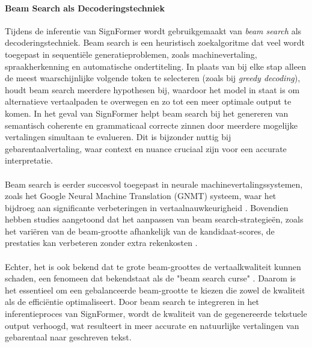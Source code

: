 \paragraph{Beam Search als Decoderingstechniek}

Tijdens de inferentie van SignFormer wordt gebruikgemaakt van \emph{beam search} als decoderingstechniek. 
Beam search is een heuristisch zoekalgoritme dat veel wordt toegepast in sequentiële generatieproblemen, zoals machinevertaling, spraakherkenning en automatische ondertiteling. 
In plaats van bij elke stap alleen de meest waarschijnlijke volgende token te selecteren (zoals bij \emph{greedy decoding}), houdt beam search meerdere hypothesen bij, waardoor het model in staat is om alternatieve vertaalpaden te overwegen en zo tot een meer optimale output te komen.
In het geval van SignFormer helpt beam search bij het genereren van semantisch coherente en grammaticaal correcte zinnen door meerdere mogelijke vertalingen simultaan te evalueren. Dit is bijzonder nuttig bij gebarentaalvertaling, waar context en nuance cruciaal zijn voor een accurate interpretatie.
\\
\\
Beam search is eerder succesvol toegepast in neurale machinevertalingssystemen, zoals het Google Neural Machine Translation (GNMT) systeem, waar het bijdroeg aan significante verbeteringen in vertaalnauwkeurigheid \autocite{wu2016google}. 
Bovendien hebben studies aangetoond dat het aanpassen van beam search-strategieën, zoals het variëren van de beam-grootte afhankelijk van de kandidaat-scores, de prestaties kan verbeteren zonder extra rekenkosten \autocite{freitag2017beam}. 
\\
\\
Echter, het is ook bekend dat te grote beam-groottes de vertaalkwaliteit kunnen schaden, een fenomeen dat bekendstaat als de "beam search curse" \autocite{yang2018breaking}. Daarom is het essentieel om een gebalanceerde beam-grootte te kiezen die zowel de kwaliteit als de efficiëntie optimaliseert.
Door beam search te integreren in het inferentieproces van SignFormer, wordt de kwaliteit van de gegenereerde tekstuele output verhoogd, wat resulteert in meer accurate en natuurlijke vertalingen van gebarentaal naar geschreven tekst.


